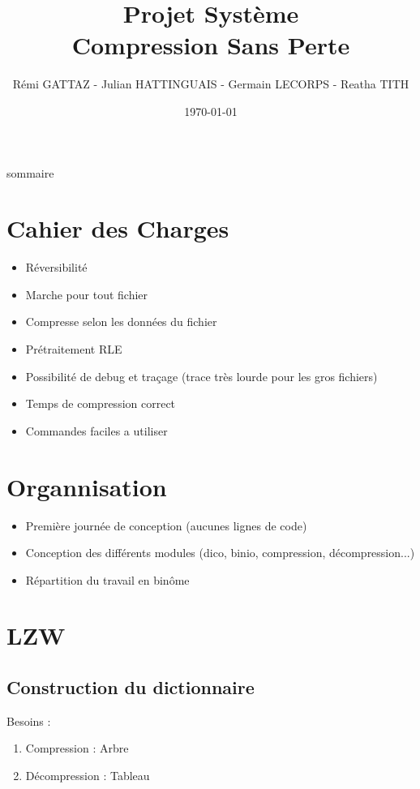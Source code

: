 \documentclass{beamer}
\title{
    Projet Système\\
    Compression Sans Perte
}
\author{Rémi GATTAZ - Julian HATTINGUAIS - Germain LECORPS - Reatha TITH}
\date{\today}
\begin{document}
\begin{frame}
\maketitle
\end{frame}

\begin{frame}{sommaire}
\tableofcontents
\end{frame}

\section{Cahier des Charges}

\begin{frame}
\begin{itemize}
\item Réversibilité
\item Marche pour tout fichier
\item Compresse selon les données du fichier
\item Prétraitement RLE
\item Possibilité de debug et traçage (trace très lourde pour les gros fichiers)
\item Temps de compression correct
\item Commandes faciles a utiliser
\end{itemize}
\end{frame}

\section{Organnisation}

\begin{frame}
\begin{itemize}
\item Première journée de conception (aucunes lignes de code)
\item Conception des différents modules (dico, binio, compression, décompression...)
\item Répartition du travail en binôme
\end{itemize}
\end{frame}


\section{LZW}

\subsection{Construction du dictionnaire}
\begin{frame}
 Besoins :
 \begin{enumerate}
  \item Compression : Arbre
  \item Décompression : Tableau
 \end{enumerate}
\end{frame}
\end{document}
